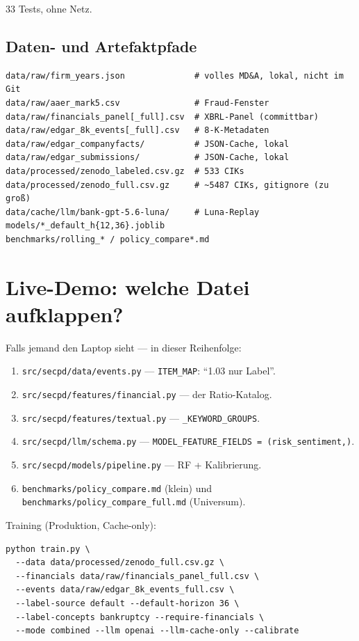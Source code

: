\documentclass[11pt,a4paper]{article}
\newcommand{\file}[1]{\texttt{\small #1}}
\begin{document}
33 Tests, ohne Netz.

\subsection{Daten- und Artefaktpfade}

\begin{lstlisting}
data/raw/firm_years.json              # volles MD&A, lokal, nicht im Git
data/raw/aaer_mark5.csv               # Fraud-Fenster
data/raw/financials_panel[_full].csv  # XBRL-Panel (committbar)
data/raw/edgar_8k_events[_full].csv   # 8-K-Metadaten
data/raw/edgar_companyfacts/          # JSON-Cache, lokal
data/raw/edgar_submissions/           # JSON-Cache, lokal
data/processed/zenodo_labeled.csv.gz  # 533 CIKs
data/processed/zenodo_full.csv.gz     # ~5487 CIKs, gitignore (zu groß)
data/cache/llm/bank-gpt-5.6-luna/     # Luna-Replay
models/*_default_h{12,36}.joblib
benchmarks/rolling_* / policy_compare*.md
\end{lstlisting}

\section{Live-Demo: welche Datei aufklappen?}

Falls jemand den Laptop sieht --- in dieser Reihenfolge:

\begin{enumerate}[leftmargin=1.4em]
  \item \file{src/secpd/data/events.py} --- \texttt{ITEM\_MAP}: ``1.03 nur Label''.
  \item \file{src/secpd/features/financial.py} --- der Ratio-Katalog.
  \item \file{src/secpd/features/textual.py} --- \texttt{\_KEYWORD\_GROUPS}.
  \item \file{src/secpd/llm/schema.py} --- \texttt{MODEL\_FEATURE\_FIELDS = (risk\_sentiment,)}.
  \item \file{src/secpd/models/pipeline.py} --- RF + Kalibrierung.
  \item \file{benchmarks/policy\_compare.md} (klein) und
        \file{benchmarks/policy\_compare\_full.md} (Universum).
\end{enumerate}

Training (Produktion, Cache-only):
\begin{lstlisting}
python train.py \
  --data data/processed/zenodo_full.csv.gz \
  --financials data/raw/financials_panel_full.csv \
  --events data/raw/edgar_8k_events_full.csv \
  --label-source default --default-horizon 36 \
  --label-concepts bankruptcy --require-financials \
  --mode combined --llm openai --llm-cache-only --calibrate
\end{lstlisting}
\end{document}
